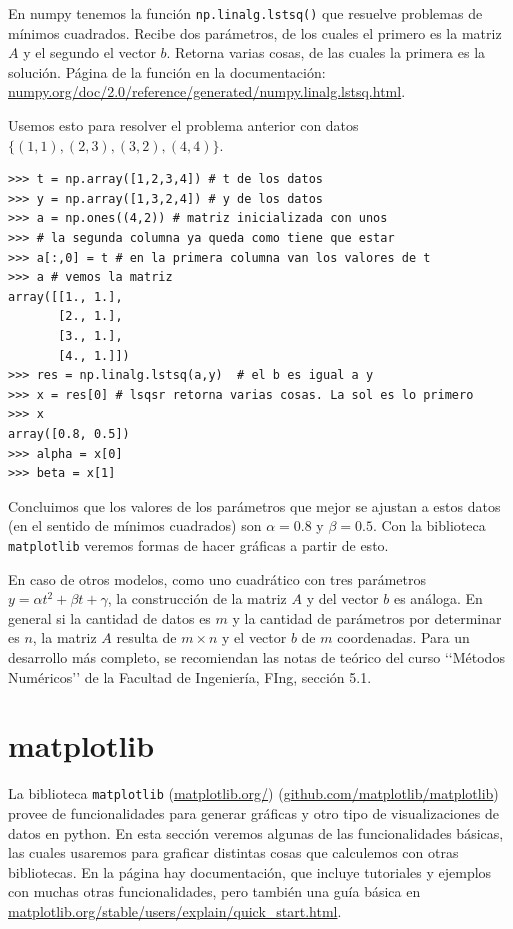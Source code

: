\documentclass[a4paper, 12pt]{report}
\theoremstyle{definition}
\begin{document}
En numpy tenemos la función {\tt np.linalg.lstsq()} que resuelve problemas de mínimos cuadrados. Recibe dos parámetros, de los cuales el primero es la matriz $A$ y el segundo el vector $b$. Retorna varias cosas, de las cuales la primera es la solución. Página de la función en la documentación: \href{https://numpy.org/doc/2.0/reference/generated/numpy.linalg.lstsq.html}{numpy.org/doc/2.0/reference/generated/numpy.linalg.lstsq.html}.

Usemos esto para resolver el problema anterior con datos $\{(1,1), (2,3), (3,2), (4,4)\}$.
\begin{verbatim}
>>> t = np.array([1,2,3,4]) # t de los datos
>>> y = np.array([1,3,2,4]) # y de los datos
>>> a = np.ones((4,2)) # matriz inicializada con unos
>>> # la segunda columna ya queda como tiene que estar
>>> a[:,0] = t # en la primera columna van los valores de t
>>> a # vemos la matriz
array([[1., 1.],
       [2., 1.],
       [3., 1.],
       [4., 1.]])
>>> res = np.linalg.lstsq(a,y)  # el b es igual a y
>>> x = res[0] # lsqsr retorna varias cosas. La sol es lo primero
>>> x
array([0.8, 0.5])
>>> alpha = x[0]
>>> beta = x[1]
\end{verbatim}
Concluimos que los valores de los parámetros que mejor se ajustan a estos datos (en el sentido de mínimos cuadrados) son $\alpha=0.8$ y $\beta = 0.5$. Con la biblioteca {\tt matplotlib} veremos formas de hacer gráficas a partir de esto.

En caso de otros modelos, como uno cuadrático con tres parámetros $y = \alpha t^2 + \beta t + \gamma$, la construcción de la matriz $A$ y del vector $b$ es análoga. En general si la cantidad de datos es $m$ y la cantidad de parámetros por determinar es $n$, la matriz $A$ resulta de $m\times n$ y el vector $b$ de $m$ coordenadas. Para un desarrollo más completo, se recomiendan las notas de teórico del curso \lq\lq Métodos Numéricos\rq\rq{} de la Facultad de Ingeniería, FIng, sección 5.1.

\section{matplotlib}

La biblioteca {\tt matplotlib} (\href{https://matplotlib.org/}{matplotlib.org/}) (\href{https://github.com/matplotlib/matplotlib}{github.com/matplotlib/matplotlib}) provee de funcionalidades para generar gráficas y otro tipo de visualizaciones de datos en python. En esta sección veremos algunas de las funcionalidades básicas, las cuales usaremos para graficar distintas cosas que calculemos con otras bibliotecas. En la página hay documentación, que incluye tutoriales y ejemplos con muchas otras funcionalidades, pero también una guía básica en \href{https://matplotlib.org/stable/users/explain/quick_start.html}{matplotlib.org/stable/users/explain/quick\_start.html}.
\end{document}
